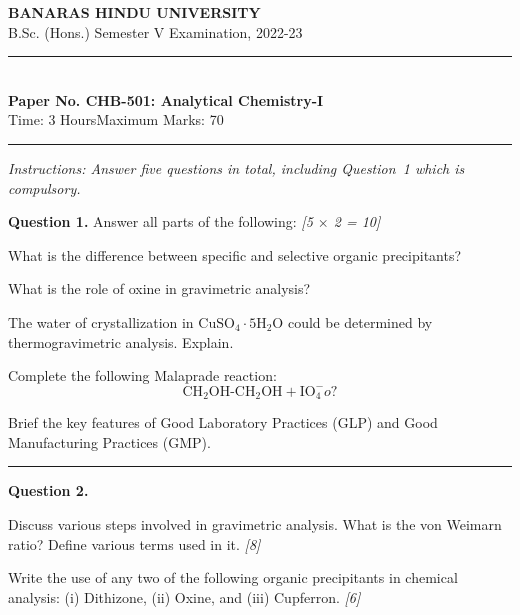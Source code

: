 \documentclass[11pt,a4paper]{article}
\newcommand{\pts}[1]{\hfill   \textit{[#1]}}
\begin{document}
\begin{center}
  {\large\bfseries BANARAS HINDU UNIVERSITY}\\[2pt]
  {\normalsize B.Sc. (Hons.) Semester V Examination, 2022-23}\\[6pt]
  \rule{0.8\linewidth}{0.5pt}\\[6pt]
  {\large\bfseries Paper No. CHB-501: Analytical Chemistry-I}\\[4pt]
  {\normalsize Time: 3 Hours\hfill Maximum Marks: 70}
\end{center}
\rule{\linewidth}{0.4pt}
\small



\noindent   \textit{Instructions: Answer five questions in total, including Question~1 which is compulsory.}

\normalsize
\bigskip




\noindent   \textbf{Question 1.} Answer all parts of the following: \pts{5 $ \times$ 2 = 10}

\begin{parts}
  \item What is the difference between specific and selective organic precipitants?
  \item What is the role of oxine in gravimetric analysis?
  \item The water of crystallization in $ \text{CuSO}_4\cdot5 \text{H}_2 \text{O}$ could be determined by thermogravimetric analysis. Explain.
  \item Complete the following Malaprade reaction:
    \[  \text{CH}_2 \text{OH-CH}_2 \text{OH} +  \text{IO}_4^-  o ? \]
  \item Brief the key features of Good Laboratory Practices (GLP) and Good Manufacturing Practices (GMP).
\end{parts}

\medskip\rule{\linewidth}{0.2pt}




\noindent   \textbf{Question 2.}

\begin{parts}
  \item Discuss various steps involved in gravimetric analysis. What is the von Weimarn ratio? Define various terms used in it. \pts{8}
  \item Write the use of any two of the following organic precipitants in chemical analysis: (i) Dithizone, (ii) Oxine, and (iii) Cupferron. \pts{6}
\end{parts}
\end{document}
